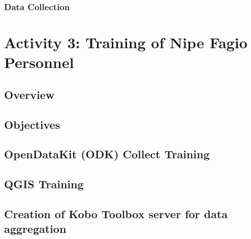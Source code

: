 \documentclass[a4paper,12pt,twoside]{article}
\begin{document}
\subsubsection{Data Collection}

    \begin{multicols}{2}
    \lipsum[0-2]
    \end{multicols}

\section{Activity 3: Training of Nipe Fagio Personnel}

\subsection{Overview}

    \begin{multicols}{2}
    \lipsum[0-5]
    \end{multicols}

\subsection{Objectives}

    \begin{multicols}{2}
    \lipsum[0-5]
    \end{multicols}

\subsection{OpenDataKit (ODK) Collect Training}

    \begin{multicols}{2}
    \lipsum[0-5]
    \end{multicols}

\subsection{QGIS Training}

    \begin{multicols}{2}
    \lipsum[0-5]
    \end{multicols}

\subsection{Creation of Kobo Toolbox  server for data aggregation}

    \begin{multicols}{2}
    \lipsum[0-5]
    \end{multicols}
	
\end{document}
